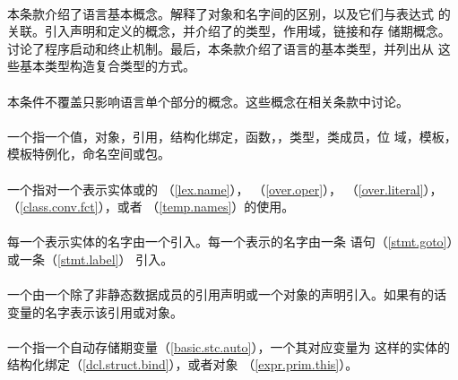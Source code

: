 \paragraph{} %
\begin{note}
  本条款介绍了\cpp{}语言基本概念。解释了对象和名字间的区别，以及它们与表达式
  \valcat{}的关联。引入声明和定义的概念，并介绍了\cpp{}的类型，作用域，链接和存
  储期概念。讨论了程序启动和终止机制。最后，本条款介绍了语言的基本类型，并列出从
  这些基本类型构造复合类型的方式。
\end{note}

\paragraph{} %
\begin{note}
  本条件不覆盖只影响语言单个部分的概念。这些概念在相关条款中讨论。
\end{note}

\paragraph{} %
一个指一个值，对象，引用，结构化绑定，函数，\enumr{}，类型，类成员，位
域，模板，模板特例化，命名空间或包。

\paragraph{} %
一个指对一个表示实体或\df{\lbl}的
             （\ref{lex.name}），
   （\ref{over.oper}），
    （\ref{over.literal}），
 （\ref{class.conv.fct}），或者
            （\ref{temp.names}）的使用。

\paragraph{} %
每一个表示实体的名字由一个引入。每一个表示\lbl{}的名字由一条
语句（\ref{stmt.goto}）或一条（\ref{stmt.label}）
引入。

\paragraph{} %
一个由一个除了非静态数据成员的引用声明或一个对象的声明引入。如果有的话
变量的名字表示该引用或对象。

\paragraph{} %
一个指一个自动存储期变量（\ref{basic.stc.auto}），一个其对应变量为
这样的实体的结构化绑定（\ref{dcl.struct.bind}），或者对象
（\ref{expr.prim.this}）。

